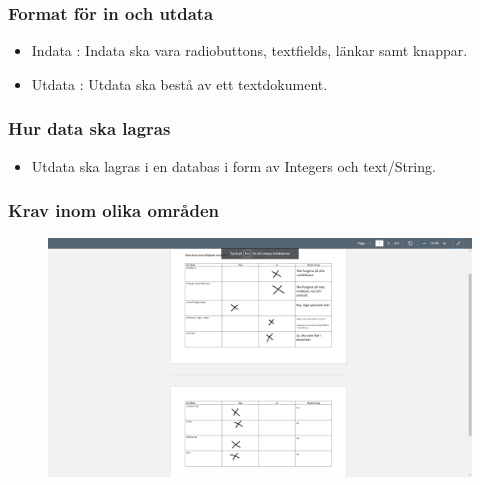 \documentclass[12pt]{article}
\begin{document}
\subsubsection{Format för in och utdata}
    \begin{itemize}
        \item Indata : Indata ska vara radiobuttons, textfields, länkar samt knappar.
          
          \item Utdata : Utdata ska bestå av ett textdokument.
    \end{itemize}

\subsubsection{Hur data ska lagras}
    \begin{itemize}
        \item Utdata ska lagras i en databas i form av Integers och text/String.
    \end{itemize}
    
\newpage
\subsubsection{Krav inom olika områden}

\begin{figure}[htp]
    \centering
    \includegraphics[width = 500px]{24.png}
    \label{fig:24}
\end{figure}
\newpage
\end{document}

